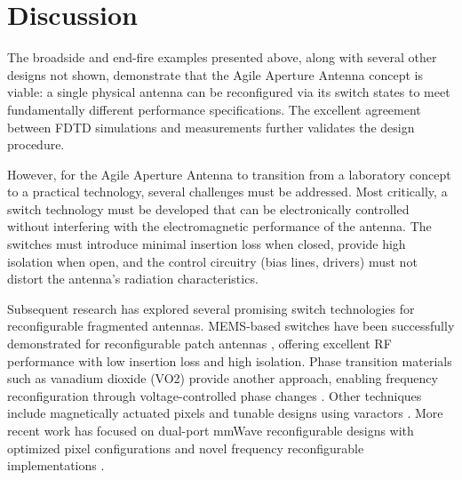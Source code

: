 \section{Discussion}

The broadside and end-fire examples presented above, along with several other designs not shown, demonstrate that the Agile Aperture Antenna concept is viable: a single physical antenna can be reconfigured via its switch states to meet fundamentally different performance specifications.  The excellent agreement between FDTD simulations and measurements further validates the design procedure.

However, for the Agile Aperture Antenna to transition from a laboratory concept to a practical technology, several challenges must be addressed.  Most critically, a switch technology must be developed that can be electronically controlled without interfering with the electromagnetic performance of the antenna.  The switches must introduce minimal insertion loss when closed, provide high isolation when open, and the control circuitry (bias lines, drivers) must not distort the antenna's radiation characteristics.

Subsequent research has explored several promising switch technologies for reconfigurable fragmented antennas.  MEMS-based switches have been successfully demonstrated for reconfigurable patch antennas \cite{Wright2016Effect,Ali2014Mems,Wright2018Mems}, offering excellent RF performance with low insertion loss and high isolation.  Phase transition materials such as vanadium dioxide (VO2) provide another approach, enabling frequency reconfiguration through voltage-controlled phase changes \cite{Lou2025Frequency}.  Other techniques include magnetically actuated pixels \cite{Pal2018Magnetically} and tunable designs using varactors \cite{Ouedraogo2014Tunable}.  More recent work has focused on dual-port mmWave reconfigurable designs with optimized pixel configurations \cite{Tang2023Dual-port} and novel frequency reconfigurable implementations \cite{Qiao2023Novel,Bichara2021Miniaturized}.

